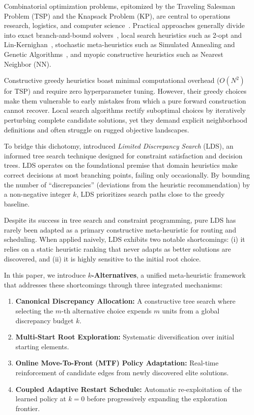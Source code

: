 \documentclass[11pt,a4paper]{article}
\begin{document}
Combinatorial optimization problems, epitomized by the Traveling Salesman Problem (TSP) and the Knapsack Problem (KP), are central to operations research, logistics, and computer science~\citep{applegate2006traveling}. Practical approaches generally divide into exact branch-and-bound solvers~\citep{applegate2006traveling}, local search heuristics such as 2-opt and Lin-Kernighan~\citep{croes1958method,lin1973effective}, stochastic meta-heuristics such as Simulated Annealing and Genetic Algorithms~\citep{lourenco2003iterated}, and myopic constructive heuristics such as Nearest Neighbor (NN).

Constructive greedy heuristics boast minimal computational overhead ($O(N^2)$ for TSP) and require zero hyperparameter tuning. However, their greedy choices make them vulnerable to early mistakes from which a pure forward construction cannot recover. Local search algorithms rectify suboptimal choices by iteratively perturbing complete candidate solutions, yet they demand explicit neighborhood definitions and often struggle on rugged objective landscapes.

To bridge this dichotomy, \citet{harvey1995limited} introduced \textit{Limited Discrepancy Search} (LDS), an informed tree search technique designed for constraint satisfaction and decision trees. LDS operates on the foundational premise that domain heuristics make correct decisions at most branching points, failing only occasionally. By bounding the number of ``discrepancies'' (deviations from the heuristic recommendation) by a non-negative integer $k$, LDS prioritizes search paths close to the greedy baseline.

Despite its success in tree search and constraint programming, pure LDS has rarely been adapted as a primary constructive meta-heuristic for routing and scheduling. When applied naively, LDS exhibits two notable shortcomings: (i) it relies on a static heuristic ranking that never adapts as better solutions are discovered, and (ii) it is highly sensitive to the initial root choice.

In this paper, we introduce \textbf{$k$-Alternatives}, a unified meta-heuristic framework that addresses these shortcomings through three integrated mechanisms:
\begin{enumerate}
    \item \textbf{Canonical Discrepancy Allocation:} A constructive tree search where selecting the $m$-th alternative choice expends $m$ units from a global discrepancy budget $k$.
    \item \textbf{Multi-Start Root Exploration:} Systematic diversification over initial starting elements.
    \item \textbf{Online Move-To-Front (MTF) Policy Adaptation:} Real-time reinforcement of candidate edges from newly discovered elite solutions.
    \item \textbf{Coupled Adaptive Restart Schedule:} Automatic re-exploitation of the learned policy at $k=0$ before progressively expanding the exploration frontier.
\end{enumerate}
\end{document}
